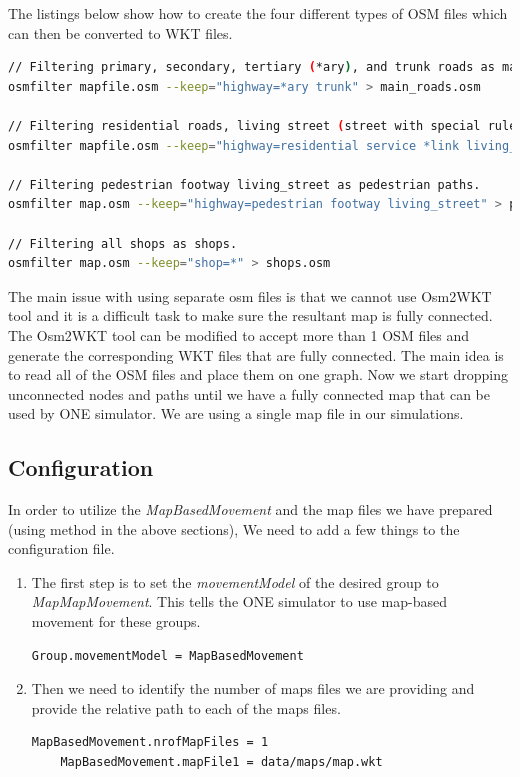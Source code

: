 The listings below show how to create the four different types of OSM files which can then be converted to WKT files.
\vspace{5mm}
\begin{lstlisting}[language=bash]
// Filtering primary, secondary, tertiary (*ary), and trunk roads as main roads.
osmfilter mapfile.osm --keep="highway=*ary trunk" > main_roads.osm

// Filtering residential roads, living street (street with special rules), service and link roads as the common roads
osmfilter mapfile.osm --keep="highway=residential service *link living_street" > roads.osm

// Filtering pedestrian footway living_street as pedestrian paths.
osmfilter map.osm --keep="highway=pedestrian footway living_street" > pedestrian_paths.osm

// Filtering all shops as shops.
osmfilter map.osm --keep="shop=*" > shops.osm
\end{lstlisting}
\vspace{5mm}

The main issue with using separate osm files is that we cannot use Osm2WKT tool \cite{mayer2010osm} and it is a difficult task to make sure the resultant map is fully connected. The Osm2WKT tool \cite{mayer2010osm} can be modified to accept more than 1 OSM files and generate the corresponding WKT files that are fully connected. The main idea is to read all of the OSM files and place them on one graph. Now we start dropping unconnected nodes and paths until we have a fully connected map that can be used by ONE simulator. We are using a single map file in our simulations.

\subsection{Configuration}
In order to utilize the \textit{MapBasedMovement} and the map files we have prepared (using method in the above sections), We need to add a few things to the configuration file.

\begin{enumerate}
	\item The first step is to set the \textit{movementModel} of the desired group to \textit{MapMapMovement}. This tells the ONE simulator to use map-based movement for these groups.
	\begin{lstlisting}[language=bash]
	Group.movementModel = MapBasedMovement
	\end{lstlisting}
	\item Then we need to identify the number of maps files we are providing and provide the relative path to each of the maps files.
	\begin{lstlisting}[language=bash]
	MapBasedMovement.nrofMapFiles = 1
	MapBasedMovement.mapFile1 = data/maps/map.wkt
	\end{lstlisting}
\end{enumerate}

